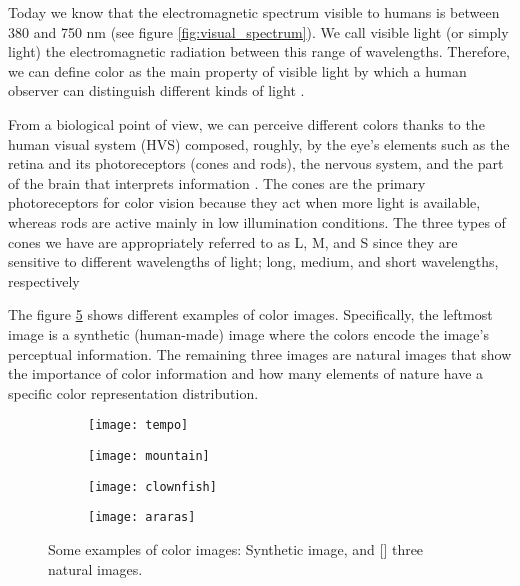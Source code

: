 Today we know that the electromagnetic spectrum visible to humans is between 380 and 750 nm (see figure \ref{fig:visual_spectrum}). We call visible light (or simply light) the electromagnetic radiation between this range of wavelengths. Therefore, we can define color as the main property of visible light by which a human observer can distinguish different kinds of light \citep{Kerr:Online:2003}.

From a biological point of view, we can perceive different colors thanks to the human visual system (HVS) composed, roughly, by the eye's elements such as the retina and its photoreceptors (cones and rods), the nervous system, and the part of the brain that interprets information \citep{Fairchild:Book:2005}. The cones are the primary photoreceptors for color vision because they act when more light is available, whereas rods are active mainly in low illumination conditions. The three types of cones we have are appropriately referred to as L, M, and S since they are sensitive to different wavelengths of light; long, medium, and short wavelengths, respectively

The figure \ref{fig:color_images} shows different examples of color images. Specifically, the leftmost image is a synthetic (human-made) image where the colors encode the image's perceptual information. The remaining three images are natural images that show the importance of color information and how many elements of nature have a specific color representation distribution.

\begin{figure}[!ht]
    \centering
    \begin{subfigure}[b]{0.24\textwidth}
        \texttt{[image: tempo]}
        \caption{}
        \label{fig:tempo}
    \end{subfigure}
    \begin{subfigure}[b]{0.24\textwidth}
        \texttt{[image: mountain]}
        \caption{}
        \label{fig:parrots}
    \end{subfigure} 
    \begin{subfigure}[b]{0.24\textwidth}
        \texttt{[image: clownfish]}
        \caption{}
        \label{fig:clownfish}
    \end{subfigure}
    \begin{subfigure}[b]{0.24\textwidth}
        \texttt{[image: araras]}
        \caption{}
        \label{fig:mountains}
    \end{subfigure}
                  
    \caption{Some examples of color images:  Synthetic image, and [] three natural images.}\label{fig:color_images}    
\end{figure}


